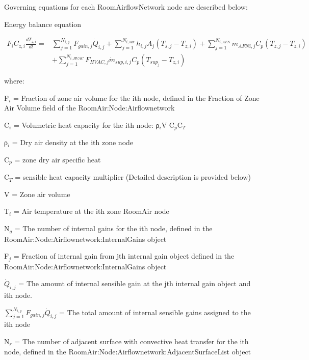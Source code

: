 Governing equations for each RoomAirflowNetwork node are described below:

Energy balance equation

\begin{equation}
\begin{split}
{F_i}{C_{z,i}}\frac{{d{T_{z,i}}}}{{dt}} =& \sum\limits_{j = 1}^{{N_{i,g}}} {{F_{gain,j}{\dot Q}_{i,j}}}  + \sum\limits_{j = 1}^{{N_{i,sur}}} {{h_{i,j}}} {A_j}\left( {{T_{s,j}} - {T_{z,i}}} \right) + \sum\limits_{j = 1}^{{N_{i,AFN}}} {{{\dot m}_{AFN i,j}}} {C_p}\left( {{T_{z,j}} - {T_{z,i}}} \right)\, \\
&+ \sum\limits_{j = 1}^{{N_{i,HVAC}}} {{{F_{HVAC,j}}{\dot m}_{sup,i,j}}} {C_p}\left( {{T_{sup_j}} - {T_{z,i}}} \right)
\end{split}
\end{equation}

where:

F\(_{i}\) = Fraction of zone air volume for the ith node, defined in the Fraction of Zone Air Volume field of the RoomAir:Node:Airflownetwork

C\(_{i}\) = Volumetric heat capacity for the ith node: ρ\(_{i}\)V C\(_{p}\)C\(_{T}\)

ρ\(_{i}\) = Dry air density at the ith zone node

C\(_{p}\) = zone dry air specific heat

C\(_{T}\) = sensible heat capacity multiplier (Detailed description is provided below)

V = Zone air volume

T\(_{i}\) = Air temperature at the ith zone RoomAir node

N\(_{g}\) = The number of internal gains for the ith node, defined in the \\ RoomAir:Node:Airflownetwork:InternalGains object

F\(_{j}\) = Fraction of internal gain from jth internal gain object defined in the \\ RoomAir:Node:Airflownetwork:InternalGains object

\({\dot Q}_{i,j}\) = The amount of internal sensible gain at the jth internal gain object and ith node.

\({\sum\limits_{j = 1}^{N_{i,g}} F_{gain,j}{\dot Q}_{i,j}}\) = The total amount of internal sensible gains assigned to the ith node

N\(_{r}\) = The number of adjacent surface with convective heat transfer for the ith node, defined in the RoomAir:Node:Airflownetwork:AdjacentSurfaceList object

